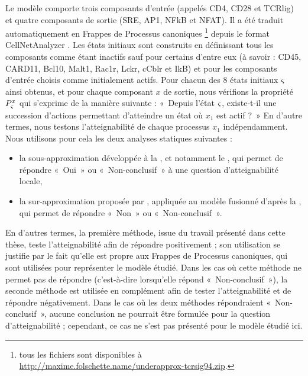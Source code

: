 Le modèle comporte trois composants d'entrée (appelés CD4, CD28 et TCRlig)
et quatre composants de sortie (SRE, AP1, NFkB et NFAT).
Il a été traduit automatiquement en Frappes de Processus canoniques%
\footnote{tous les fichiers sont disponibles à
\url{http://maxime.folschette.name/underapprox-tcrsig94.zip}.}
depuis le format CellNetAnalyzer \cite{klamt2007structural}.
Les états initiaux sont construits en définissant tous les composants
comme étant inactifs sauf pour certains d'entre eux
(à savoir : CD45, CARD11, Bcl10, Malt1, Rac1r, Lckr, cCblr et IkB)
et pour les composants d'entrée choisis comme initialement actifs.
Pour chacun des 8 états initiaux $\varsigma$ ainsi obtenus,
et pour chaque composant $x$ de sortie,
nous vérifions la propriété $P_\varsigma^x$ qui s'exprime de la manière suivante :
«~Depuis l'état $\varsigma$, existe-t-il une succession d'actions permettant d'atteindre
un état où $x_1$ est actif ?~»
En d'autre termes, nous testons l'atteignabilité de chaque processus $x_1$
indépendamment.
Nous utilisons pour cela les deux analyses statiques suivantes :
\begin{itemize}
  \item la sous-approximation développée à la ,
    et notamment le ,
    qui permet de répondre «~Oui~» ou «~Non-conclusif~»
    à une question d'atteignabilité locale,
  \item la sur-approximation proposée par ,
    appliquée au modèle fusionné d'après la ,
    qui permet de répondre «~Non~» ou «~Non-conclusif~».
\end{itemize}
En d'autres termes, la première méthode, issue du travail présenté dans cette thèse,
teste l'atteignabilité afin de répondre positivement ;
son utilisation se justifie par le fait qu'elle est propre aux Frappes de Processus canoniques,
qui sont utilisées pour représenter le modèle étudié.
Dans les cas où cette méthode ne permet pas de répondre (c'est-à-dire lorsqu'elle
répond «~Non-conclusif~»),
la seconde méthode est utilisée en complément afin de tester l'atteignabilité
et de répondre négativement.
Dans le cas où les deux méthodes répondraient «~Non-conclusif~», aucune conclusion ne pourrait
être formulée pour la question d'atteignabilité ;
cependant, ce cas ne s'est pas présenté pour le modèle étudié ici.

